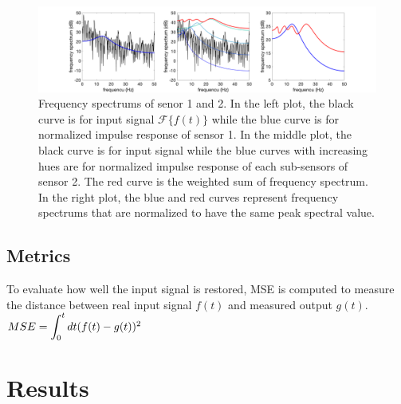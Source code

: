 \documentclass[12pt,a4paper,twocolumn]{article}
\begin{document}
\begin{figure}[!ht]
    \includegraphics[width=\textwidth]{lab2_spectrum.png}
    \caption{Frequency spectrums of senor 1 and 2. In the left plot, the black curve is for input signal $\mathcal{F}\{f(t)\}$ while the blue curve is for normalized impulse response of sensor 1. In the middle plot, the black curve is for input signal while the blue curves with increasing hues are for normalized impulse response of each sub-sensors of sensor 2. The red curve is the weighted sum of frequency spectrum. In the right plot, the blue and red curves represent frequency spectrums that are normalized to have the same peak spectral value.}
    \label{fig:4}
\end{figure}

\subsection{Metrics}
To evaluate how well the input signal is restored, MSE is computed to measure the distance between real input signal $f(t)$ and measured output $g(t)$.\\
$MSE=\bint{0}{t}dt (f(t) - g(t))^2$

\section{Results}
\end{document}
